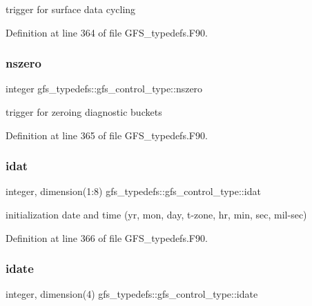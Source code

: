 trigger for surface data cycling 



Definition at line 364 of file G\+F\+S\+\_\+typedefs.\+F90.

\mbox{\label{structgfs__typedefs_1_1gfs__control__type_a1eeb6f79528f7d58bc8216f9a49b0b8f}} 
\subsubsection{nszero}
{\footnotesize\ttfamily integer gfs\+\_\+typedefs\+::gfs\+\_\+control\+\_\+type\+::nszero}



trigger for zeroing diagnostic buckets 



Definition at line 365 of file G\+F\+S\+\_\+typedefs.\+F90.

\mbox{\label{structgfs__typedefs_1_1gfs__control__type_ace4de319632990bd2adc6f08f6f1a6f6}} 
\subsubsection{idat}
{\footnotesize\ttfamily integer, dimension(1\+:8) gfs\+\_\+typedefs\+::gfs\+\_\+control\+\_\+type\+::idat}



initialization date and time (yr, mon, day, t-\/zone, hr, min, sec, mil-\/sec) 



Definition at line 366 of file G\+F\+S\+\_\+typedefs.\+F90.

\mbox{\label{structgfs__typedefs_1_1gfs__control__type_a8d89c04b6b1738e78176aa0a0d85b55e}} 
\subsubsection{idate}
{\footnotesize\ttfamily integer, dimension(4) gfs\+\_\+typedefs\+::gfs\+\_\+control\+\_\+type\+::idate}



